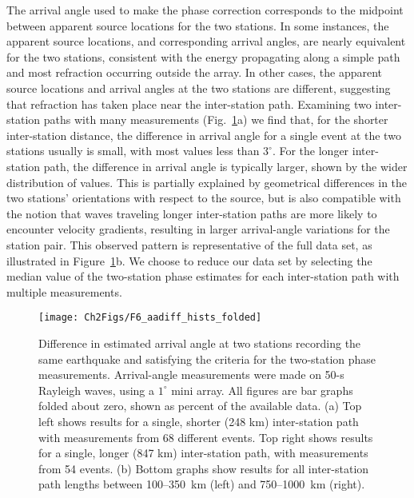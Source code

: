 \documentclass[12pt,oneside]{book}
\newcommand{\degree}[1]{\mbox{$#1^{\circ}$}}
\begin{document}
The arrival angle used to make the phase correction corresponds to the midpoint between apparent source locations for the two stations. In some instances, the apparent source locations, and corresponding arrival angles, are nearly equivalent for the two stations, consistent with the energy propagating along a simple path and most refraction occurring outside the array. In other cases, the apparent source locations and arrival angles at the two stations are different, suggesting that refraction has taken place near the inter-station path. Examining two inter-station paths with many measurements (Fig.~\ref{figpv:tsaadiff}a) we find that, for the shorter inter-station distance, the difference in arrival angle for a single event at the two stations usually is small, with most values less than \degree{3}. For the longer inter-station path, the difference in arrival angle is typically larger, shown by the wider distribution of values. This is partially explained by geometrical differences in the two stations' orientations with respect to the source, but is also compatible with the notion that waves traveling longer inter-station paths are more likely to encounter velocity gradients, resulting in larger arrival-angle variations for the station pair. This observed pattern is representative of the full data set, as illustrated in Figure~\ref{figpv:tsaadiff}b. We choose to reduce our data set by selecting the median value of the two-station phase estimates for each inter-station path with multiple measurements. 

\begin{figure} 
\begin{center}
\texttt{[image: Ch2Figs/F6\_aadiff\_hists\_folded]} 
\caption[Difference in estimated arrival angle for station pairs]{Difference in estimated arrival angle at two stations recording the same earthquake and satisfying the criteria for the two-station phase measurements. Arrival-angle measurements were made on 50-s Rayleigh waves, using a \degree{1} mini array. All figures are bar graphs folded about zero, shown as percent of the available data. (a) Top left shows results for a single, shorter (248 km) inter-station path with measurements from 68 different events. Top right shows results for a single, longer (847 km) inter-station path, with measurements from 54 events. (b) Bottom graphs show results for all inter-station path lengths between 100--350~km (left) and 750--1000~km (right). }
\label{figpv:tsaadiff}
\end{center}
\end{figure}
%
\end{document}
